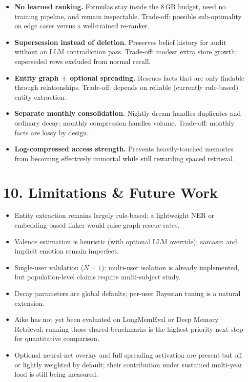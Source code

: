 \documentclass[]{article}
\begin{document}
\begin{itemize}
\item \textbf{No learned ranking.} Formulas stay inside the 8\,GB budget,
  need no training pipeline, and remain inspectable. Trade-off: possible
  sub-optimality on edge cases versus a well-trained re-ranker.
\item \textbf{Supersession instead of deletion.} Preserves belief history
  for audit without an LLM contradiction pass. Trade-off: modest extra
  store growth; superseded rows excluded from normal recall.
\item \textbf{Entity graph + optional spreading.} Rescues facts that are
  only findable through relationships. Trade-off: depends on reliable
  (currently rule-based) entity extraction.
\item \textbf{Separate monthly consolidation.} Nightly dream handles
  duplicates and ordinary decay; monthly compression handles volume.
  Trade-off: monthly facts are lossy by design.
\item \textbf{Log-compressed access strength.} Prevents heavily-touched
  memories from becoming effectively immortal while still rewarding
  spaced retrieval.
\end{itemize}

\hypertarget{limitations-future-work}{%
\section{\texorpdfstring{\textbf{10. Limitations \& Future
Work}}{10. Limitations \& Future Work}}\label{limitations-future-work}}

\begin{itemize}
\item Entity extraction remains largely rule-based; a lightweight NER or
  embedding-based linker would raise graph rescue rates.
\item Valence estimation is heuristic (with optional LLM override); sarcasm
  and implicit emotion remain imperfect.
\item Single-user validation (\(N=1\)); multi-user isolation is already
  implemented, but population-level claims require multi-subject study.
\item Decay parameters are global defaults; per-user Bayesian tuning is a
  natural extension.
\item Aiko has not yet been evaluated on LongMemEval or Deep Memory
  Retrieval; running those shared benchmarks is the highest-priority next
  step for quantitative comparison.
\item Optional neural-net overlay and full spreading activation are
  present but off or lightly weighted by default; their contribution under
  sustained multi-year load is still being measured.
\end{itemize}
\end{document}

